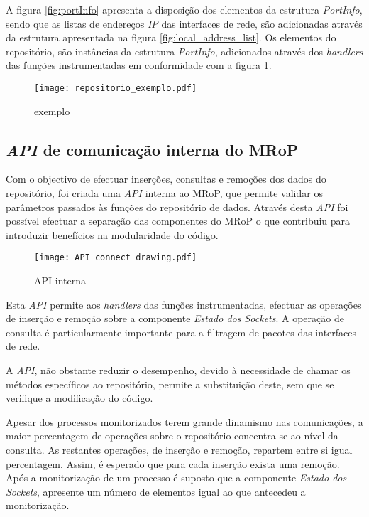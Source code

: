 A figura \ref{fig:portInfo} apresenta a disposição dos elementos da estrutura \textit{PortInfo}, sendo que as listas de endereços \textit{IP} das interfaces de rede, são adicionadas através da estrutura apresentada na figura \ref{fig:local_address_list}.
Os elementos do repositório, são instâncias da estrutura \textit{PortInfo}, adicionados através dos \textit{handlers} das funções instrumentadas em conformidade com a figura \ref{fig:repo_example}.

\begin{figure}[ht]
\centering
\texttt{[image: repositorio\_exemplo.pdf]}
\caption{exemplo}
\label{fig:repo_example}
\end{figure}

\subsection{\textit{API} de comunicação interna do MRoP}
\label{sub:repo_api}

Com o objectivo de efectuar inserções, consultas e remoções dos dados do repositório, foi criada uma \textit{API} interna ao MRoP, que permite validar os parâmetros passados às funções do repositório de dados.
Através desta \textit{API} foi possível efectuar a separação das componentes do MRoP o que contribuiu para introduzir benefícios na modularidade do código.

\begin{figure}[ht]
\centering
\texttt{[image: API\_connect\_drawing.pdf]}
\caption{API interna}
\label{fig:api_connect}
\end{figure}

Esta \textit{API} permite aos \textit{handlers} das funções instrumentadas, efectuar as operações de inserção e remoção sobre a componente \textit{Estado dos Sockets}.
A operação de consulta é particularmente importante para a filtragem de pacotes das interfaces de rede.

A \textit{API}, não obstante reduzir o desempenho, devido à necessidade de chamar os métodos específicos ao repositório, permite a substituição deste, sem que se verifique a modificação do código.

Apesar dos processos monitorizados terem grande dinamismo nas comunicações, a maior percentagem de operações sobre o repositório concentra-se ao nível da consulta.
As restantes operações, de inserção e remoção, repartem entre si igual percentagem.
Assim, é esperado que para cada inserção exista uma remoção.
Após a monitorização de um processo é suposto que a componente \textit{Estado dos Sockets}, apresente um número de elementos igual ao que antecedeu a monitorização.

